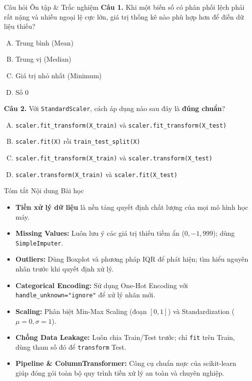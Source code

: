 \documentclass[aspectratio=169,11pt]{beamer}
\newcommand{\code}[1]{\texttt{#1}}
\newcommand{\smallgap}{\vspace{0.35em}}
\begin{document}
\begin{frame}{Câu hỏi Ôn tập \& Trắc nghiệm}
\textbf{Câu 1.} Khi một biến số có phân phối lệch phải rất nặng và nhiều ngoại lệ cực lớn, giá trị thống kê nào phù hợp hơn để điền dữ liệu thiếu?
\begin{enumerate}[A.]
  \item Trung bình (Mean)
  \item Trung vị (Median)
  \item Giá trị nhỏ nhất (Minimum)
  \item Số 0
\end{enumerate}

\smallgap
\textbf{Câu 2.} Với \code{StandardScaler}, cách áp dụng nào sau đây là \textbf{đúng chuẩn}?
\begin{enumerate}[A.]
  \item \code{scaler.fit\_transform(X\_train)} và \code{scaler.fit\_transform(X\_test)}
  \item \code{scaler.fit(X)} rồi \code{train\_test\_split(X)}
  \item \code{scaler.fit\_transform(X\_train)} và \code{scaler.transform(X\_test)}
  \item \code{scaler.transform(X\_train)} và \code{scaler.fit(X\_test)}
\end{enumerate}
\end{frame}

\begin{frame}{Tóm tắt Nội dung Bài học}
\begin{itemize}
  \item \textbf{Tiền xử lý dữ liệu} là nền tảng quyết định chất lượng của mọi mô hình học máy.
  \item \textbf{Missing Values:} Luôn lưu ý các giá trị thiếu tiềm ẩn ($0, -1, 999$); dùng \code{SimpleImputer}.
  \item \textbf{Outliers:} Dùng Boxplot và phương pháp IQR để phát hiện; tìm hiểu nguyên nhân trước khi quyết định xử lý.
  \item \textbf{Categorical Encoding:} Sử dụng One-Hot Encoding với \code{handle\_unknown="ignore"} để xử lý nhãn mới.
  \item \textbf{Scaling:} Phân biệt Min-Max Scaling (đoạn $[0,1]$) và Standardization ($\mu=0, \sigma=1$).
  \item \textbf{Chống Data Leakage:} Luôn chia Train/Test trước; chỉ \code{fit} trên Train, dùng tham số đó để \code{transform} Test.
  \item \textbf{Pipeline \& ColumnTransformer:} Công cụ chuẩn mực của scikit-learn giúp đóng gói toàn bộ quy trình tiền xử lý an toàn và chuyên nghiệp.
\end{itemize}
\end{frame}
\end{document}
